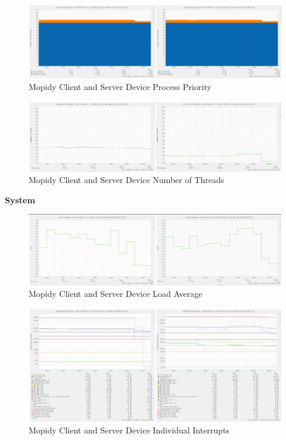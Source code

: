 \documentclass[11pt,a4paper]{scrreprt}
\begin{document}
\begin{figure}[H]
\includegraphics{ResultsAndAnalysis/MopidyServerTestImages/021MopidyProcessPriority.png}
\centering
\caption{Mopidy Client and Server Device Process Priority}
\label{MopidyProcessPriority}
\end{figure}

\begin{figure}[H]
\includegraphics{ResultsAndAnalysis/MopidyServerTestImages/019MopidyNoOfThreads.png}
\centering
\caption{Mopidy Client and Server Device Number of Threads}
\label{MopidyNumThreads}
\end{figure}

\textbf{System}

\begin{figure}[H]
\includegraphics{ResultsAndAnalysis/MopidyServerTestImages/016MopidyLoadAverage.png}
\centering
\caption{Mopidy Client and Server Device Load Average}
\label{MopidyLoadAvg}
\end{figure}

\begin{figure}[H]
\includegraphics{ResultsAndAnalysis/MopidyServerTestImages/014MopidyIndividualInterrupts.png}
\centering
\caption{Mopidy Client and Server Device Individual Interrupts}
\label{MopidyIndInt}
\end{figure}
\end{document}
